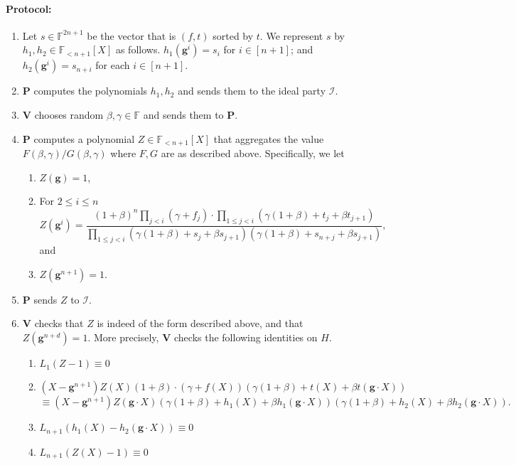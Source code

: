 \documentclass[11pt]{article} %
\newcommand{\F}{\ensuremath{\mathbb F}\xspace}
\newcommand{\dom}{\ensuremath{H}\xspace}
\newcommand{\prv}{\ensuremath{\mathsf{\mathbf{P}}}\xspace}
\newcommand{\prvpoly}{\ensuremath{\prv}\xspace}
\newcommand{\verpoly}{\ensuremath{\ver}\xspace}%
\newcommand{\ideal}{\ensuremath{\mathcal{I}}\xspace}
\newcommand{\ver}{\ensuremath{\mathsf{\mathbf{V}}}\xspace}
\newcommand{\hgen}{\ensuremath{\mathbf{g}}\xspace}
\newcommand{\cosetgen}{\ensuremath{\mathbf{\kappa}}\xspace}
\newcommand{\polysofdeg}[1]{\ensuremath{\F_{< #1}[X]}\xspace}
\newcommand{\sone}{\ensuremath{ h_1}\xspace}
\newcommand{\stwo}{\ensuremath{ h_{2}}\xspace}
\begin{document}
\paragraph{Protocol:}
\begin{enumerate}
 \item Let $s\in \F^{2n+1}$ be the vector that is $(f,t)$ sorted by $t$. We represent $s$ by $\sone,\stwo \in \polysofdeg{n+1}$ as follows.
$\sone (\hgen^i) = s_i$ for $i\in [n+1]$; and $\stwo(\hgen ^i)= s_{n+i}$ for each $i\in [n+1]$.
 
 \item \prvpoly computes the polynomials $\sone,\stwo$ and sends them to the ideal party \ideal.
 \item \verpoly chooses random $\beta,\gamma \in \F$ and sends them to \prvpoly.
 \item \prvpoly computes a polynomial $Z\in \polysofdeg{n+1}$ that aggregates the value $F(\beta,\gamma)/G(\beta,\gamma)$ where $F,G$ are as described above. Specifically, we let
\begin{enumerate}
 \item  $Z(\hgen) = 1$,
\item For $2\leq i \leq n$
\[Z(\hgen^{i})= \frac{(1+\beta)^n \prod_{j < i} (\gamma + f_j)\cdot \prod_{1\leq j < i} (\gamma(1+\beta)+ t_j + \beta t_{j+1})}{\prod_{1\leq j <i} (\gamma(1+\beta)+ s_j + \beta s_{j+1})(\gamma(1+\beta)+ s_{n+j} + \beta s_{j+1})},\]
 and
\item $Z(\hgen^{n+1})=1$.
\end{enumerate}
 \item \prvpoly sends $Z$ to \ideal.
 \item \verpoly checks that $Z$ is indeed of the form described above, and that $Z(\hgen^{n+d})=1$. More precisely, \verpoly checks the following identities on $H$.
 \begin{enumerate}
  \item $L_1(Z-1)\equiv 0$
  \item 
  \[(X-\hgen^{n+1})Z(X)(1+\beta)\cdot (\gamma + f(X))(\gamma(1+\beta)+ t(X)+\beta t(\hgen \cdot X) )\]
  \[\equiv (X-\hgen^{n+1}) Z(\hgen\cdot X)(\gamma(1+\beta)+ \sone(X)+\beta \sone(\hgen \cdot X))(\gamma(1+\beta)+ \stwo(X)+\beta \stwo(\hgen \cdot X)).\]
  \item\label{check:consist} $L_{n+1}(\sone(X)-\stwo(\hgen \cdot X))\equiv 0$
  \item $L_{n+1}(Z(X)-1)\equiv 0$
 

\end{enumerate}
\end{enumerate}
\end{document}
